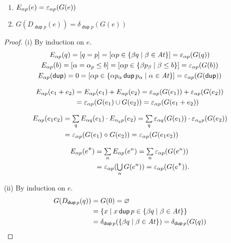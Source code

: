 \documentclass{article}
\newcommand\At{\ensuremath{\mathit{At}}}
\renewcommand\smash{\mathrel{\diamond}}
\newcommand\ssum{\mathop{\textstyle\sum}}
\newcommand\sbigcup{\mathop{\textstyle\bigcup}}
\newcommand\pdup{\mathop{\mathsf{dup}}}
\newcommand\bval[1]{[#1]}
\renewcommand\star{^{\textstyle *}}
\begin{document}
\begin{theorem}\ 
\label{thm:main}
\begin{enumerate}
\romanize
\item
$E_{\alpha p}(e) = \varepsilon_{\alpha p}(G(e))$
\item
$G(D_{\pdup p}(e)) = \delta_{\pdup p}(G(e))$
\end{enumerate}
\end{theorem}

\begin{proof}
(i) By induction on $e$.
\begin{gather*}
E_{\alpha p}(q)
= \bval{q = p}
= \bval{\alpha p\in\set{\beta q}{\beta\in\At}}
= \eps_{\alpha p}(G(q))\\
E_{\alpha p}(b)
= \bval{\alpha=\alpha_p\leq b}
= \bval{\alpha p\in\set{\beta p_\beta}{\beta\leq b}}
= \eps_{\alpha p}(G(b))\\
E_{\alpha p}(\pdup)
= 0
= \bval{\alpha p\in\set{\alpha p_\alpha\pdup p_\alpha}{\alpha\in\At}}
= \eps_{\alpha p}(G(\pdup))
\end{gather*}

\begin{align*}
E_{\alpha p}(e_1+e_2)
&= E_{\alpha p}(e_1)+E_{\alpha p}(e_2)
= \varepsilon_{\alpha p}(G(e_1)) + \varepsilon_{\alpha p}(G(e_2))\\
&= \varepsilon_{\alpha p}(G(e_1)\cup G(e_2)) 
= \varepsilon_{\alpha p}(G(e_1+e_2))
\end{align*}

\begin{align*}
E_{\alpha p}(e_1e_2)
&= \ssum_{q} E_{\alpha q}(e_1)\cdot E_{\alpha_q p}(e_2)
= \ssum_{q} \eps_{\alpha q}(G(e_1))\cdot \eps_{\alpha_q p}(G(e_2))\\
&= \eps_{\alpha p}(G(e_1)\smash G(e_2))
= \eps_{\alpha p}(G(e_1e_2))
\end{align*}

\begin{align*}
E_{\alpha p}(e\star)
&= \ssum_n E_{\alpha p}(e^n)
= \ssum_n \eps_{\alpha p}(G(e^n))\\
&= \eps_{\alpha p}(\sbigcup_n G(e^n))
= \eps_{\alpha p}(G(e\star)).
\end{align*}

(ii) By induction on $e$.
\begin{align*}
G(D_{\pdup p}(q))
&= G(0)
= \emptyset\\
&= \set{x}{x\pdup p\in\set{\beta q}{\beta\in\At}}\\
&= \delta_{\pdup p}(\set{\beta q}{\beta\in\At})
= \delta_{\pdup p}(G(q))
\end{align*}


\end{proof}
\end{document}
